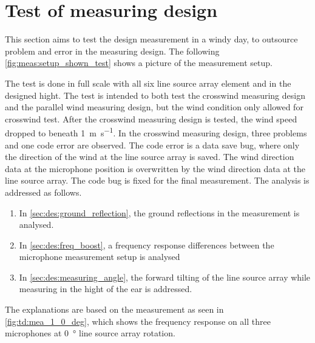 \section{Test of measuring design}\label{sec:ds:test_of_mes_des}
This section aims to test the design measurement in a windy day, to outsource problem and error in the measuring design. The following \autoref{fig:meas:setup_shown_test} shows a picture of the measurement setup.


The test is done in full scale with all six line source array element and in the designed hight. The test is intended to both test the crosswind measuring design and the parallel wind measuring design, but the wind condition only allowed for crosswind test. After the crosswind measuring design is tested, the wind speed dropped to beneath \SI{1}{\meter\per\second}.
In the crosswind measuring design, three problems and one code error are observed. The code error is a data save bug, where only the direction of the wind at the line source array is saved. The wind direction data at the microphone position is overwritten by the wind direction data at the line source array. The code bug is fixed for the final measurement. The analysis is addressed as follows.  

\begin{enumerate}
\item In \autoref{sec:des:ground_reflection}, the ground reflections in the measurement is analysed.
\item In \autoref{sec:des:freq_boost}, a frequency response differences between the microphone measurement setup is analysed
\item In \autoref{sec:des:measuring_angle}, the forward tilting of the line source array while measuring in the hight of the ear is addressed. 
\end{enumerate}


The explanations are based on the measurement as seen in \autoref{fig:td:mea_1_0_deg}, which shows the frequency response on all three microphones at \SI{0}{\degree} line source array rotation.


